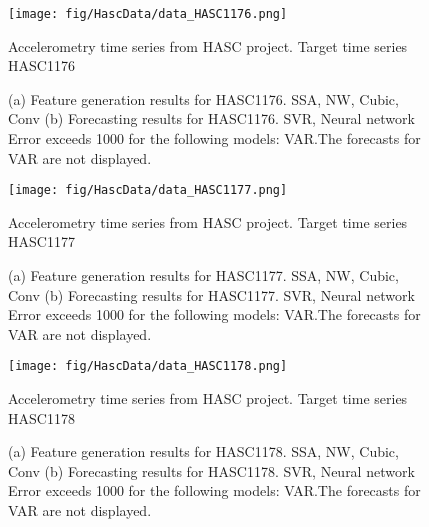 \documentclass[12pt]{article}
\begin{document}
\begin{figure}
\centering
\texttt{[image: fig/HascData/data\_HASC1176.png]}
\caption{Accelerometry time series from HASC project. Target time series	HASC1176	}
\end{figure}


\begin{figure}
\centering
{}
\caption{(a)	Feature generation results for	HASC1176.	SSA, NW, Cubic, Conv	(b)	Forecasting results for	HASC1176.	SVR, Neural network	Error exceeds 1000 for the following models: VAR.The forecasts for VAR are not displayed.	}
\end{figure}


\begin{figure}
\centering
\texttt{[image: fig/HascData/data\_HASC1177.png]}
\caption{Accelerometry time series from HASC project. Target time series	HASC1177	}
\end{figure}


\begin{figure}
\centering
{}
\caption{(a)	Feature generation results for	HASC1177.	SSA, NW, Cubic, Conv	(b)	Forecasting results for	HASC1177.	SVR, Neural network	Error exceeds 1000 for the following models: VAR.The forecasts for VAR are not displayed.	}
\end{figure}


\begin{figure}
\centering
\texttt{[image: fig/HascData/data\_HASC1178.png]}
\caption{Accelerometry time series from HASC project. Target time series	HASC1178	}
\end{figure}


\begin{figure}
\centering
{}
\caption{(a)	Feature generation results for	HASC1178.	SSA, NW, Cubic, Conv	(b)	Forecasting results for	HASC1178.	SVR, Neural network	Error exceeds 1000 for the following models: VAR.The forecasts for VAR are not displayed.	}
\end{figure}
\end{document}
